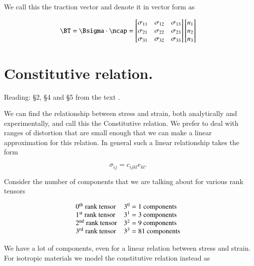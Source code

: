 We call this the traction vector and denote it in vector form as

\begin{equation}\label{eqn:continuumL5:50}
\BT = \Bsigma \cdot \ncap
=
\begin{bmatrix}
\sigma_{11} & \sigma_{12} & \sigma_{13} \\
\sigma_{21} & \sigma_{22} & \sigma_{23} \\
\sigma_{31} & \sigma_{32} & \sigma_{33}
\end{bmatrix}
\begin{bmatrix}
n_1 \\
n_2 \\
n_3
\end{bmatrix}
\end{equation}

\section{Constitutive relation.}

Reading: \S 2, \S 4 and \S 5 from the text \cite{landau1960theory}.

We can find the relationship between stress and strain, both analytically and experimentally, and call this the Constitutive relation.  We prefer to deal with ranges of distortion that are small enough that we can make a linear approximation for this relation.  In general such a linear relationship takes the form

\begin{equation}\label{eqn:continuumL5:70}
\sigma_{ij} = c_{ijkl} e_{kl}.
\end{equation}

Consider the number of components that we are talking about for various rank tensors

\begin{equation}\label{eqn:continuumL5:90}
\begin{array}{l l}
\mbox{$0^\text{th}$ rank tensor} & \mbox{$3^0 = 1$ components} \\
\mbox{$1^\text{st}$ rank tensor} & \mbox{$3^1 = 3$ components} \\
\mbox{$2^\text{nd}$ rank tensor} & \mbox{$3^2 = 9$ components} \\
\mbox{$3^\text{rd}$ rank tensor} & \mbox{$3^3 = 81$ components}
\end{array}
\end{equation}

We have a lot of components, even for a linear relation between stress and strain.  For isotropic materials we model the constitutive relation instead as

